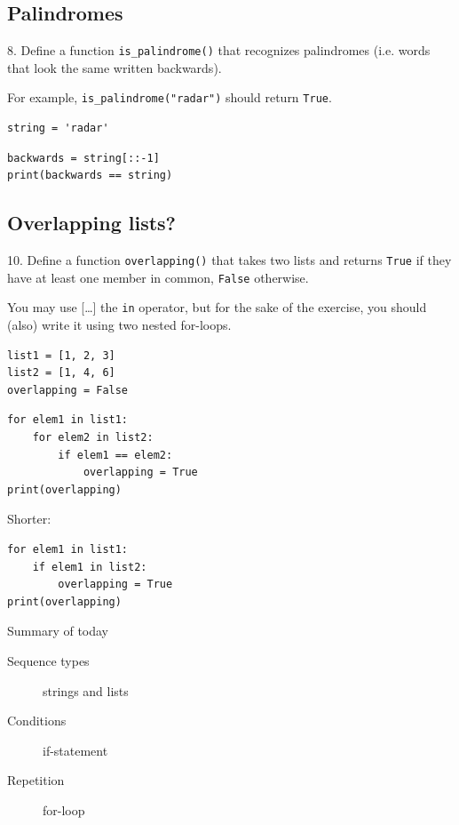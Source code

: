 \documentclass[aspectratio=169,usenames,dvipsnames]{beamer}
\begin{document}
\subsection{Palindromes}
\begin{frame}[fragile]
8. Define a function \texttt{is\_palindrome()} that recognizes palindromes
   (i.e. words that look the same written backwards).

   \vspace{1em}
   For example, \texttt{is\_palindrome("radar")} should return \texttt{True}.

\begin{lstlisting}
string = 'radar'
\end{lstlisting}
\pause
\begin{lstlisting}
backwards = string[::-1]
print(backwards == string)
\end{lstlisting}
\end{frame}
 
\subsection{Overlapping lists?}
\begin{frame}[fragile]
10. Define a function \texttt{overlapping()} that takes two lists and returns
    \texttt{True} if they have at least one member in common, \texttt{False}
    otherwise.

    \vspace{1em}
    You may use [\dots] the \texttt{in} operator, but for the sake of the
    exercise, you should (also) write it using two nested for-loops.
\begin{lstlisting}
list1 = [1, 2, 3]
list2 = [1, 4, 6]
overlapping = False
\end{lstlisting}
\pause
\begin{lstlisting}
for elem1 in list1:
    for elem2 in list2:
        if elem1 == elem2:
            overlapping = True
print(overlapping)
\end{lstlisting}
\pause
Shorter:
\begin{lstlisting}
for elem1 in list1:
    if elem1 in list2:
        overlapping = True
print(overlapping)
\end{lstlisting}
\end{frame}

\begin{frame}{Summary of today}
    \begin{description}
        \item[Sequence types] strings and lists
        \item[Conditions] if-statement
        \item[Repetition] for-loop
    \end{description}
\end{frame}
\end{document}
